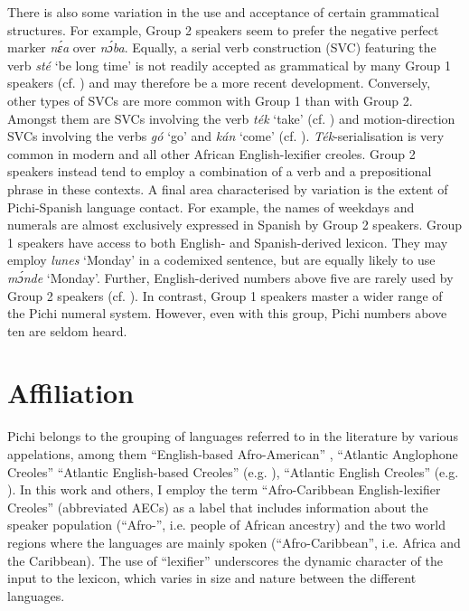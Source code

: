 \bigskip
There is also some variation in the use and acceptance of certain grammatical structures. For example, Group 2 speakers seem to prefer the negative perfect marker \textit{nɛ́a} over \textit{nɔ́ba}. Equally, a serial verb construction (SVC) featuring the verb \textit{sté} ‘be long time’ is not readily accepted as grammatical by many Group 1 speakers (cf. ) and may therefore be a more recent development. Conversely, other types of SVCs are more common with Group 1 than with Group 2. Amongst them are SVCs involving the verb \textit{ték} ‘take’ (cf. ) and motion-direction SVCs involving the verbs \textit{gó} ‘go’ and \textit{kán} ‘come’ (cf. ). \textit{Ték}-serialisation is very common in modern  and all other African English-lexifier creoles. Group 2 speakers instead tend to employ a combination of a verb and a prepositional phrase in these contexts. A final area characterised by variation is the extent of Pichi-Spanish language contact. For example, the names of weekdays and numerals are almost exclusively expressed in Spanish by Group 2 speakers. Group 1 speakers have access to both English- and Spanish-derived lexicon. They may employ \textit{lunes} ‘Monday’ in a codemixed sentence, but are equally likely to use \textit{mɔ́nde} ‘Monday’. Further, English-derived numbers above five are rarely used by Group 2 speakers (cf. ). In contrast, Group 1 speakers master a wider range of the Pichi numeral system. However, even with this group, Pichi numbers above ten are seldom heard.

\section{Affiliation}\label{sec:1.4}
\largerpage
Pichi belongs to the grouping of languages referred to in the literature by various appelations, among them “English-based Afro-American” \citep{Alleyne1980}, “Atlantic Anglophone Creoles” \citep{Hancock1986,Hancock1987} “Atlantic English-based Creoles” (e.g. \citealt{MuyskenSmith1990}), “Atlantic English Creoles” (e.g. \citealt{Baker1999}). In this work and others, I employ the term “Afro-Caribbean English-lexifier Creoles” (abbreviated AECs) \citep{Faraclas2004} as a label that includes information about the speaker population (\mbox{“Afro-”}, i.e. people of African ancestry) and the two world regions where the languages are mainly spoken (“Afro-Caribbean”, i.e. Africa and the Caribbean). The use of “lexifier” underscores the dynamic character of the  input to the lexicon, which varies in size and nature between the different languages. 


